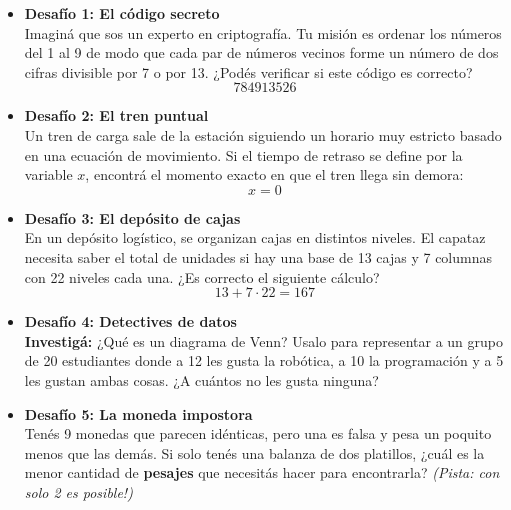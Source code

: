 \documentclass[12pt]{article}
\begin{document}
\begin{desafio}
    \begin{itemize}
        \item \textbf{Desafío 1: El código secreto} \\[4pt]
        Imaginá que sos un experto en criptografía. Tu misión es ordenar los números del 1 al 9 de modo que cada par de números vecinos forme un número de dos cifras divisible por 7 o por 13. ¿Podés verificar si este código es correcto?
        \[
        784913526
        \]
        \vspace{8pt}

        \item \textbf{Desafío 2: El tren puntual} \\[4pt]
        Un tren de carga sale de la estación siguiendo un horario muy estricto basado en una ecuación de movimiento. Si el tiempo de retraso se define por la variable $x$, encontrá el momento exacto en que el tren llega sin demora:
        \[
        x = 0
        \]
        \vspace{8pt}

        \item \textbf{Desafío 3: El depósito de cajas} \\[4pt]
        En un depósito logístico, se organizan cajas en distintos niveles. El capataz necesita saber el total de unidades si hay una base de 13 cajas y 7 columnas con 22 niveles cada una. ¿Es correcto el siguiente cálculo?
        \[
        13 + 7 \cdot 22 = 167
        \]
        \vspace{8pt}

        \item \textbf{Desafío 4: Detectives de datos} \\[4pt]
        \textbf{Investigá:} ¿Qué es un diagrama de Venn? Usalo para representar a un grupo de 20 estudiantes donde a 12 les gusta la robótica, a 10 la programación y a 5 les gustan ambas cosas. ¿A cuántos no les gusta ninguna?
        \vspace{8pt}

        \item \textbf{Desafío 5: La moneda impostora} \\[4pt]
        Tenés 9 monedas que parecen idénticas, pero una es falsa y pesa un poquito menos que las demás. Si solo tenés una balanza de dos platillos, ¿cuál es la menor cantidad de \textbf{pesajes} que necesitás hacer para encontrarla? \textit{(Pista: con solo 2 es posible!)}
    \end{itemize}
\end{desafio}
\end{document}
